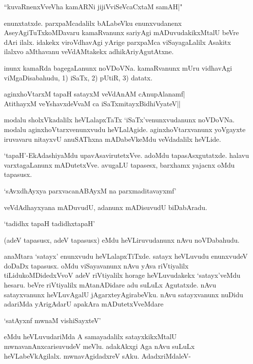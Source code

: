 \begin{shloka}
``kuvaRnenxVveVha kamARNi jijiVviSeVcaCxtaM samAH|"
\end{shloka}

enunxtatxde. parxpaMcadalilx bALabeVku enunxvudanenx AseyAgiTuTxkoMDavaru kamaRvanunx sariyAgi mADuvudakikxMtalU beVre dAri ilalx. idakekx viroVdhavAgi yArige parxpaMca viSayagaLalilx Asakitx ilalxvo aMthavanu veVdAMtakekx adhikAriyAgutAtxne.

inunx kamaRda bagegaLanunx noVDoVNa. kamaRvanunx mUru vidhavAgi viMgaDisabahudu, 1) iSaTx, 2) pUtiR, 3) datatx.

\begin{shloka}
aginxhoVtarxM tapaH satayxM veVdAnAM cAnupAlanamf|\\
AtithayxM veYshavxdeVvaM ca iSaTxmitayxBidhiVyateV||
\end{shloka}

modalu sholxVkadalilx heVLalapxTaTx `iSaTx'venunxvudanunx noVDoVNa. modalu aginxhoVtarxvenunxvudu heVLalAgide. aginxhoVtarxvanunx yoVgayxte iruvavaru nitayxvU anuSAThxna mADabeVkeMdu veVdadalilx heVLide.

`tapaH'-EkAdashiyaMdu upavAsavirutetxVve. adoMdu tapasAsxgutatxde. halavu varxtagaLanunx mADutetxVve. avugaLU tapasesx, barxhamx yajacnx oMdu tapasusx.

\begin{shloka}
`sAvxdhAyxya parxvacanABAyxM na parxmaditavayxmf'
\end{shloka}

veVdAdhayxyana mADuvudU, adanunx mADisuvudU biDabAradu.

\begin{shloka}
`tadidhx tapaH tadidhxtapaH'
\end{shloka}

(adeV tapasusx, adeV tapasusx) eMdu heVLiruvudanunx nAvu noVDabahudu.

anaMtara `satayx' enunxvudu heVLalapxTiTxde. satayx heVLuvudu enunxvudeV doDaDx tapasusx. oMdu viSayavanunx nAvu yAva riVtiyalilx tiLidukoMDidedxVvoV adeV riVtiyalilx horage heVLuvudakekx `satayx'veMdu hesaru. beVre riVtiyalilx mAtanADidare adu suLuLx Agutatxde. nAvu satayxvanunx heVLuvAgalU jAgarxteyAgirabeVku. nAvu satayxvanunx nuDidu adariMda yArigAdarU apakAra mADutetxVveMdare

\begin{shloka}
`satAyxnf mwnaM vishiSayxteV'
\end{shloka}

eMdu heVLuvudariMda A samayadalilx satayxkikxMtalU mwnavanAnxcarisuvudeV meVlu. adakAkxgi Aga nAvu suLuLx heVLabeVkAgilalx. mwnavAgidadxreV sAku. AdadxriMdaleV-

